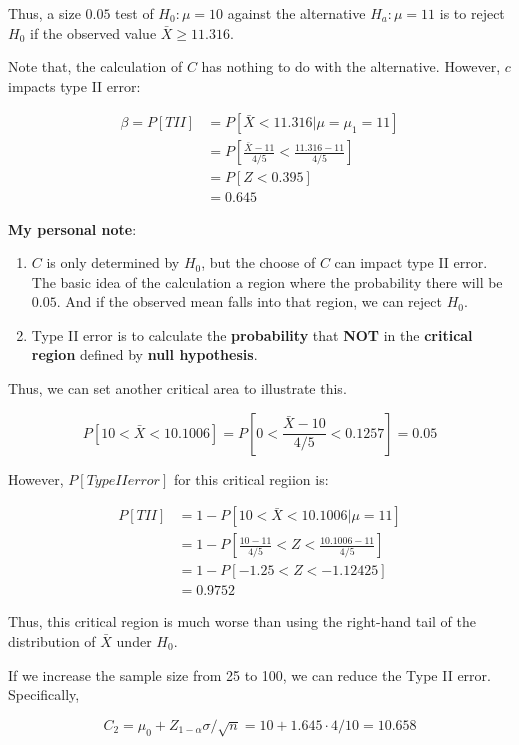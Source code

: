 \documentclass[]{book}
\begin{document}
Thus, a size \(0.05\) test of \(H_0: \mu=10\) against the alternative \(H_a:\mu=11\) is to reject \(H_0\) if the observed value \(\bar{X} \geq 11.316\).

Note that, the calculation of \(C\) has nothing to do with the alternative. However, \(c\) impacts type II error:

\[\begin{aligned} \beta=P[TII] &=P[\bar{X}<11.316 |\mu=\mu_1=11] \\ &=P[\frac{\bar{X}-11}{4/5}<\frac{11.316-11}{4/5}] \\ &=P[Z <0.395] \\ &=0.645 \end{aligned}\]

\textbf{My personal note}:

\begin{enumerate}
\def\labelenumi{(\arabic{enumi})}
\item
  \(C\) is only determined by \(H_0\), but the choose of \(C\) can impact type II error. The basic idea of the calculation a region where the probability there will be \(0.05\). And if the observed mean falls into that region, we can reject \(H_0\).
\item
  Type II error is to calculate the \textbf{probability} that \textbf{NOT} in the \textbf{critical region} defined by \textbf{null hypothesis}.
\end{enumerate}

Thus, we can set another critical area to illustrate this.

\[P[10 < \bar{X}<10.1006]=P[0 <\frac{\bar{X}-10}{4/5} <0.1257]=0.05\]

However, \(P[Type II error]\) for this critical regiion is:

\[\begin{aligned} P[TII] &=1-P[10<\bar{X}<10.1006|\mu=11] \\ &=1-P[\frac{10-11}{4/5}<Z<\frac{10.1006-11}{4/5}] \\ &=1-P[-1.25 <Z<-1.12425] \\ &=0.9752 \end{aligned}\]

Thus, this critical region is much worse than using the right-hand tail of the distribution of \(\bar{X}\) under \(H_0\).

If we increase the sample size from 25 to 100, we can reduce the Type II error. Specifically,

\[C_2=\mu_0+Z_{1-\alpha} \sigma/\sqrt{n}=10+1.645 \cdot 4/10=10.658\]
\end{document}
